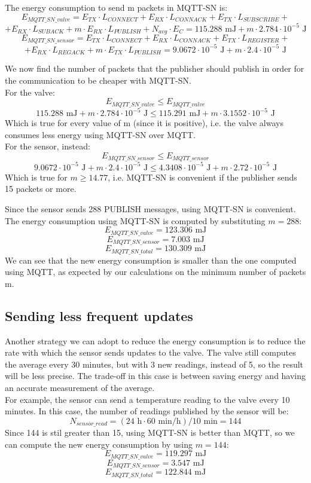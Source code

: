 The energy consumption to send m packets in MQTT-SN is:
\[E_{MQTT\_SN\_valve} = E_{TX} \cdot L_{CONNECT} + E_{RX} \cdot L_{CONNACK} + E_{TX} \cdot L_{SUBSCRIBE} +\]
\[+ E_{RX} \cdot L_{SUBACK} + m \cdot E_{RX} \cdot L_{PUBLISH} + N_{avg} \cdot E_{C} = 115.288 \text{ mJ} + m \cdot 2.784 \cdot 10^{-5} \text{ J}\]
\[E_{MQTT\_SN\_sensor} = E_{TX} \cdot L_{CONNECT} + E_{RX} \cdot L_{CONNACK} + E_{TX} \cdot L_{REGISTER} +\]
\[+ E_{RX} \cdot L_{REGACK} + m \cdot E_{TX} \cdot L_{PUBLISH} = 9.0672 \cdot 10^{-5} \text{ J} + m \cdot 2.4 \cdot 10^{-5} \text{ J}\]

We now find the number of packets that the publisher should publish in order for the communication to be cheaper with MQTT-SN.\\
For the valve:
\[E_{MQTT\_SN\_valve} \leq E_{MQTT\_valve} \]
\[115.288 \text{ mJ} + m \cdot 2.784 \cdot 10^{-5} \text{ J}  \leq 115.291 \text{ mJ} + m \cdot 3.1552 \cdot 10^{-5} \text{ J}\]
Which is true for every value of m (since it is positive), i.e. the valve always consumes less energy using MQTT-SN over MQTT.\\
For the sensor, instead:
\[E_{MQTT\_SN\_sensor} \leq E_{MQTT\_sensor}\]
\[9.0672 \cdot 10^{-5} \text{ J} + m \cdot 2.4 \cdot 10^{-5} \text{ J} \leq 4.3408 \cdot 10^{-5} \text{ J} + m \cdot 2.72 \cdot 10^{-5} \text{ J}\]
Which is true for $m \geq 14.77$, i.e. MQTT-SN is convenient if the publisher sends 15 packets or more.

Since the sensor sends 288 PUBLISH messages, using MQTT-SN is convenient. The energy consumption using MQTT-SN is computed by substituting $m = 288$:
\[E_{MQTT\_SN\_valve} = 123.306 \text{ mJ}\]
\[E_{MQTT\_SN\_sensor} = 7.003 \text{ mJ}\]
\[E_{MQTT\_SN\_total} = 130.309 \text{ mJ}\]
We can see that the new energy consumption is smaller than the one computed using MQTT, as expected by our calculations on the minimum number of packets m.

\subsection{Sending less frequent updates}
Another strategy we can adopt to reduce the energy consumption is to reduce the rate with which the sensor sends updates to the valve. The valve still computes the average every 30 minutes, but with 3 new readings, instead of 5, so the result will be less precise. The trade-off in this case is between saving energy and having an accurate measurement of the average.\\
For example, the sensor can send a temperature reading to the valve every 10 minutes. In this case, the number of readings published by the sensor will be:
\[N_{sensor\_read} = (24\text{ h}  \cdot 60 \text{ min/h}) / 10 \text{ min} = 144\]
Since 144 is stil greater than 15, using MQTT-SN is better than MQTT, so we can compute the new energy consumption by using $m = 144$:
\[E_{MQTT\_SN\_valve} = 119.297 \text{ mJ}\]
\[E_{MQTT\_SN\_sensor} = 3.547 \text{ mJ}\]
\[E_{MQTT\_SN\_total} = 122.844 \text{ mJ}\]


